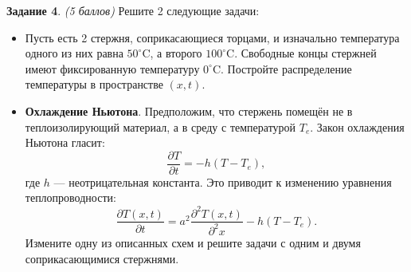 \documentclass[12pt]{article}
\newcommand{\task}[2]{\vspace{6pt}
\textbf{Задание #1}. #2 %
}
\begin{document}
\task{4}{\textit{(5 баллов)}} Решите 2 следующие задачи:
\begin{itemize}
\item Пусть есть 2 стержня, соприкасающиеся торцами, и изначально температура одного из них равна $50^\circ \mathrm{C}$, а второго $100^\circ \mathrm{C}$. Свободные концы стержней имеют фиксированную температуру $0^\circ \mathrm{C}$. Постройте распределение температуры в пространстве $(x,t)$.
\item \textbf{Охлаждение Ньютона}. Предположим, что стержень помещён не в теплоизолирующий материал, а в среду с температурой $T_e$. Закон охлаждения Ньютона гласит:
\[\frac{\partial T}{\partial t}=-h(T-T_e),\]
где $h$ --- неотрицательная константа. Это приводит к изменению уравнения теплопроводности:
\[\frac{\partial T(x, t)}{\partial t}=a^2\frac{\partial^2 T(x, t)}{\partial^2 x}-h(T-T_e).\]
Измените одну из описанных схем и решите задачи с одним и двумя соприкасающимися стержнями.
\end{itemize}
\end{document}

